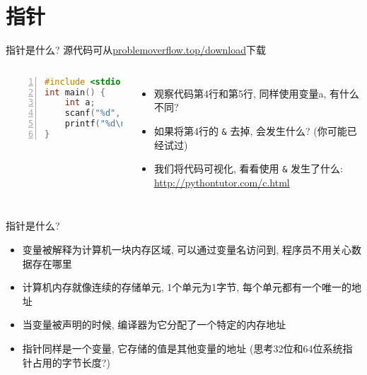 \section{指针}\label{sec:指针}

\begin{frame}[fragile]{指针是什么?}
    源代码可从\href{http://problemoverflow.top/download/pointer.zip}{problemoverflow.top/download}下载
    \emptyline
    \begin{columns}[T,onlytextwidth]
        \scriptsize
        \begin{lstlisting}[language=c,numbers=left]
#include <stdio.h>
int main() {
    int a;
    scanf("%d", &a);
    printf("%d\n", a);
}
        \end{lstlisting}

        \begin{itemize}[<+- | alert@+>]
            \item 观察代码第4行和第5行, 同样使用变量a, 有什么不同?
            \item 如果将第4行的 \texttt{\&} 去掉, 会发生什么? (你可能已经试过)
            \item 我们将代码可视化, 看看使用 \texttt{\&} 发生了什么: \href{http://pythontutor.com/c.html#code=\%23include\%20\%3Cstdio.h\%3E\%0A\%0Aint\%20main\%20\%28\%29\%0A\%7B\%0A\%20\%20int\%20firstvalue,\%20secondvalue\%3B\%0A\%20\%20int\%20*\%20mypointer\%3B\%0A\%0A\%20\%20mypointer\%20\%3D\%20\%26firstvalue\%3B\%0A\%20\%20*mypointer\%20\%3D\%2010\%3B\%0A\%20\%20mypointer\%20\%3D\%20\%26secondvalue\%3B\%0A\%20\%20*mypointer\%20\%3D\%2020\%3B\%0A\%20\%20printf\%28\%22firstvalue\%20is\%20\%25d\%5Cn\%22,\%20firstvalue\%29\%3B\%0A\%20\%20printf\%28\%22secondvalue\%20is\%20\%25d\%5Cn\%22,\%20secondvalue\%29\%3B\%0A\%20\%20return\%200\%3B\%0A\%7D&mode=edit&origin=opt-frontend.js&py=c&rawInputLstJSON=\%5B\%5D}{http://pythontutor.com/c.html}
        \end{itemize}
    \end{columns}
\end{frame}

\begin{frame}[fragile]{指针是什么?}
    \begin{itemize}[<+- | alert@+>]
        \item 变量被解释为计算机一块内存区域, 可以通过变量名访问到, 程序员不用关心数据存在哪里
        \item 计算机内存就像连续的存储单元, 1个单元为1字节, 每个单元都有一个唯一的地址
        \item 当变量被声明的时候, 编译器为它分配了一个特定的内存地址
        \item 指针同样是一个变量, 它存储的值是其他变量的地址 (思考32位和64位系统指针占用的字节长度?)
    \end{itemize}
\end{frame}

